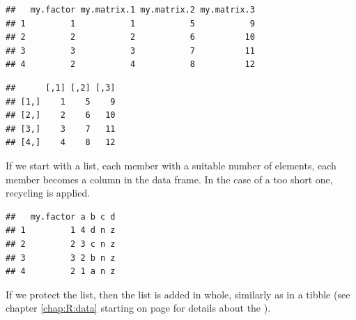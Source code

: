 \documentclass[krantz2]{krantz}\usepackage{knitr}
\begin{document}
\begin{advplayground}
\begin{knitrout}\footnotesize
{}\color{fgcolor}\begin{kframe}
\begin{alltt}
 \hlkwb{<-}  
\end{alltt}
\begin{verbatim}
##   my.factor my.matrix.1 my.matrix.2 my.matrix.3
## 1         1           1           5           9
## 2         2           2           6          10
## 3         3           3           7          11
## 4         2           4           8          12
\end{verbatim}
\begin{alltt}
\hlopt{$}
\end{alltt}
\begin{verbatim}
##      [,1] [,2] [,3]
## [1,]    1    5    9
## [2,]    2    6   10
## [3,]    3    7   11
## [4,]    4    8   12
\end{verbatim}
\end{kframe}
\end{knitrout}

If we start with a list, each member with a suitable number of elements, each member becomes a column in the data frame. In the case of a too short one, recycling is applied.

\begin{knitrout}\footnotesize
{}\color{fgcolor}\begin{kframe}
\begin{alltt}
 \hlkwb{<-} \hlstd{(} \hlstd{=} \hlopt{:}\hlstd{,}  \hlstd{= letters[}\hlopt{:}\hlstd{],}  \hlstd{=} \hlstd{,}  \hlstd{=} \hlstd{)}
\hlkwb{<-} 
\end{alltt}
\begin{verbatim}
##   my.factor a b c d
## 1         1 4 d n z
## 2         2 3 c n z
## 3         3 2 b n z
## 4         2 1 a n z
\end{verbatim}
\end{kframe}
\end{knitrout}

If we protect the list, then the list is added in whole, similarly as in a tibble (see chapter \ref{chap:R:data} starting on page \pageref{chap:R:data} for details about the ).


\end{advplayground}
\end{document}
